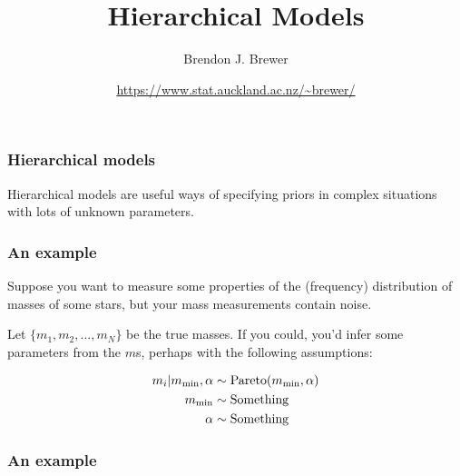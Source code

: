 \documentclass{beamer}
\title{Hierarchical Models}
\author{Brendon J. Brewer}
\institute{Department of Statistics\\
The University of Auckland}
\date{\color{blue}\url{https://www.stat.auckland.ac.nz/~brewer/}}
\begin{document}

\begin{frame}[t,plain]
\titlepage
\end{frame}


\begin{frame}[t,plain]
\frametitle{Hierarchical models}
\vspace{2em}
Hierarchical models are useful ways of specifying priors in complex situations
with lots of unknown parameters.

\end{frame}



\begin{frame}[t,plain]
\frametitle{An example}
Suppose you want to measure some properties of the (frequency) distribution of
masses of some stars, but your mass measurements contain noise.\vspace{1em}

Let $\{m_1, m_2, ..., m_N\}$ be the true masses. If you could, you'd infer
some parameters from the $m$s, perhaps with the following assumptions:

\begin{align}
m_i | m_{\rm min},\alpha &\sim \textnormal{Pareto}(m_{\rm min}, \alpha) \\
m_{\rm min} &\sim \textnormal{Something} \\
\alpha      &\sim \textnormal{Something}
\end{align}


\end{frame}

\begin{frame}[t,plain]
\frametitle{An example}

\end{frame}
\end{document}
